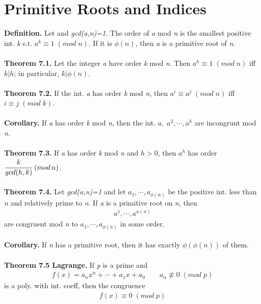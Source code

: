 \documentclass[a4paper,10pt]{article}
\begin{document}
\section{Primitive Roots and Indices}
\textbf{Definition.} Let  and \textit{gcd(a,n)=1}. The order of \textit{a} mod \textit{n} is the smallest positive int. \textit{k} s.t. \textit{$a^{k}\equiv1 \; (mod \; n)$}. If it is \textit{$\phi(n)$}, then \textit{a} is a primitive root of \textit{n}. \\ \\
\textbf{Theorem 7.1.} Let the integer \textit{a} have order \textit{k} mod \textit{n}. Then \textit{$a^{h}\equiv1 \; (mod \; n)$} iff \textit{$k|h$}; in particular, \textit{$k|\phi(n)$}. \\ \\
\textbf{Theorem 7.2.} If the int. \textit{a} has order \textit{k} mod \textit{n}, then \textit{$a^{i}\equiv a^{j} \; (mod \; n)$} iff \textit{$i\equiv j \; (mod \; k)$}. \\ \\ 
\textbf{Corollary.} If \textit{a} has order \textit{k} mod \textit{n}, then the int. \textit{$a, \; a^{2},\cdots,a^{k}$} are incongrunt mod \textit{n}. \\ \\ 
\textbf{Theorem 7.3.} If \textit{a} has order \textit{k} mod \textit{n} and \textit{$h>0$}, then \textit{$a^{h}$} has order \textit{$\cfrac{k}{gcd(h,k)}\; (mod \, n)$}. \\ \\
\textbf{Theorem 7.4.} Let \textit{gcd(a,n)=1} and let \textit{$a_{1}, \cdots, a_{\phi(n)}$} be the positive int. less than \textit{n} and relatively prime to \textit{n}. If \textit{a} is a primitive root on \textit{n}, then
\begin{align}
a^{1}, \cdots, a^{\phi(n)}
\end{align}
are congruent mod \textit{n} to \textit{$a_{1}, \cdots, a_{\phi(n)}$} in some order. \\ \\
\textbf{Corollary.} If \textit{n} has a primitive root, then it has exactly \textit{$\phi(\phi(n))$} of them. \\ \\
\textbf{Theorem 7.5 Lagrange.} If \textit{p} is a prime and
\begin{align}
f(x)=a_{n}x^{n}+\cdots+a_{1}x+a_{0} \qquad a_{n}\not\equiv0 \; (mod \; p)
\end{align}
is a poly. with int. coeff, then the congruence
\begin{align}
f(x)\equiv 0 \; (mod \; p)
\end{align}
\end{document}
